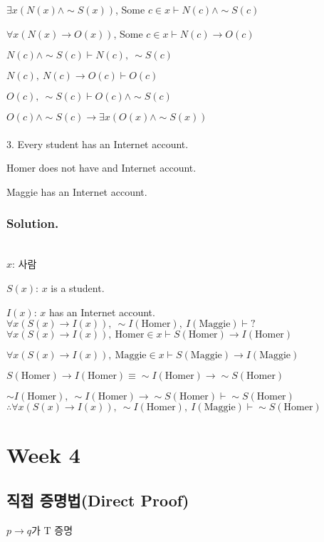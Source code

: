 $\exists x (N(x) \land  \sim S(x))$, Some $c \in x \vdash N(c) \land \sim S(c)$

$\forall x(N(x)\to O(x))$, Some $c \in x \vdash N(c) \to O(c)$

$N(c) \land \sim S(c) \vdash N(c),\ \sim S(c)$

$N(c),\ N(c) \to O(c) \vdash O(c)$

$O(c),\ \sim S(c) \vdash O(c) \land \sim S(c)$

$O(c) \land \sim S(c) \to \exists x(O(x) \land \sim S(x))$\\\\
3. Every student has an Internet account.

Homer does not have and Internet account.

Maggie has an Internet account.
\subsubsection{Solution.}\hphantom{}\\

$x$: 사람

$S(x)$: $x$ is a student.

$I(x)$: $x$ has an Internet account.\\

$\forall x (S(x) \to I(x)),\ \sim I(\text{Homer}),\ I(\text{Maggie}) \vdash ?$\\

$\forall x (S(x) \to I(x)),\ \text{Homer} \in x \vdash S(\text{Homer}) \to I(\text{Homer})$

$\forall x (S(x) \to I(x)),\ \text{Maggie} \in x \vdash S(\text{Maggie}) \to I(\text{Maggie})$

$S(\text{Homer}) \to I(\text{Homer}) \equiv \sim I(\text{Homer}) \to \sim S(\text{Homer})$

$\sim I(\text{Homer}),\ \sim I(\text{Homer}) \to \sim S(\text{Homer}) \vdash \sim S(\text{Homer})$\\

$\therefore \forall x (S(x) \to I(x)),\ \sim I(\text{Homer}),\ I(\text{Maggie}) \vdash \sim S(\text{Homer})$

\newpage
\section{Week 4}
\subsection{직접 증명법(Direct Proof)}
$p \to q$가 T 증명

